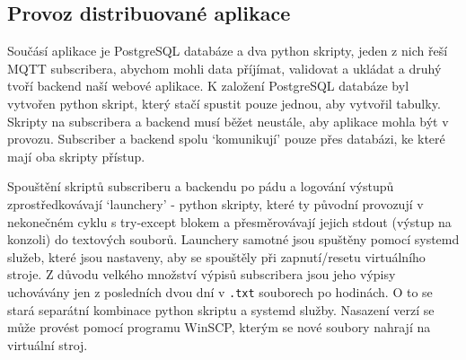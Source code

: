 \subsection{Provoz distribuované aplikace}
Součásí aplikace je PostgreSQL databáze a dva python skripty, jeden z nich řeší MQTT subscribera, abychom mohli data příjímat, validovat a ukládat a druhý tvoří backend naší webové aplikace.
K založení PostgreSQL databáze byl vytvořen python skript, který stačí spustit pouze jednou, aby vytvořil tabulky. Skripty na subscribera a backend musí běžet neustále, aby aplikace mohla být v provozu.
Subscriber a backend spolu `komunikují' pouze přes databázi, ke které mají oba skripty přístup.

Spouštění skriptů subscriberu a backendu po pádu a logování výstupů zprostředkovávají `launchery' - python skripty, které ty původní provozují v nekonečném cyklu s try-except blokem a přesměrovávají jejich stdout (výstup na konzoli) do textových souborů.
Launchery samotné jsou spuštěny pomocí systemd služeb, které jsou nastaveny, aby se spouštěly při zapnutí/resetu virtuálního stroje.
Z důvodu velkého množství výpisů subscribera jsou jeho výpisy uchovávány jen z posledních dvou dní v \verb|.txt| souborech po hodinách. O to se stará separátní kombinace python skriptu a systemd služby.
Nasazení verzí se může provést pomocí programu WinSCP, kterým se nové soubory nahrají na virtuální stroj.